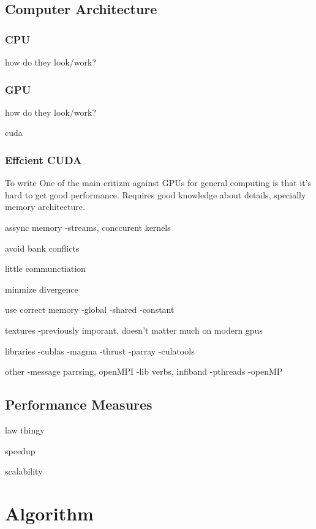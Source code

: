 \documentclass[10pt,a4paper]{article}
\begin{document}
\subsection{Computer Architecture}

\subsubsection{CPU}
how do they look/work?

\subsubsection{GPU}
how do they look/work?

cuda\cite{cuda}

\subsubsection{Effcient CUDA}
To write
One of the main critizm against GPUs for general computing is that it's hard to get good performance. Requires good knowledge about details, specially memory architecture.

assync memory
-streams, conccurent kernels

avoid bank conflicts

little communctiation

minmize divergence

use correct memory
-global
-shared
-constant

textures
-previously imporant, doesn't matter much on modern gpus

libraries
-cublas
-magma
-thrust
-parray
-culatools

other
-message parrsing, openMPI
-lib verbs, infiband
-pthreads
-openMP

\cite{cuda, cuda_best_practice}

\subsection{Performance Measures}
law thingy

speedup

scalability

\section{Algorithm}
\end{document}
